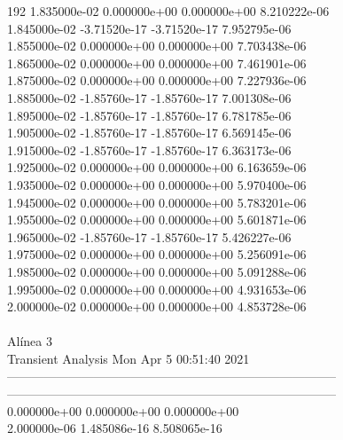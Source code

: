 192	1.835000e-02	0.000000e+00	0.000000e+00	8.210222e-06	\\ 	1.845000e-02	-3.71520e-17	-3.71520e-17	7.952795e-06	\\ 	1.855000e-02	0.000000e+00	0.000000e+00	7.703438e-06	\\ 	1.865000e-02	0.000000e+00	0.000000e+00	7.461901e-06	\\ 	1.875000e-02	0.000000e+00	0.000000e+00	7.227936e-06	\\ 	1.885000e-02	-1.85760e-17	-1.85760e-17	7.001308e-06	\\ 	1.895000e-02	-1.85760e-17	-1.85760e-17	6.781785e-06	\\ 	1.905000e-02	-1.85760e-17	-1.85760e-17	6.569145e-06	\\ 	1.915000e-02	-1.85760e-17	-1.85760e-17	6.363173e-06	\\ 	1.925000e-02	0.000000e+00	0.000000e+00	6.163659e-06	\\ 	1.935000e-02	0.000000e+00	0.000000e+00	5.970400e-06	\\ 	1.945000e-02	0.000000e+00	0.000000e+00	5.783201e-06	\\ 	1.955000e-02	0.000000e+00	0.000000e+00	5.601871e-06	\\ 	1.965000e-02	-1.85760e-17	-1.85760e-17	5.426227e-06	\\ 	1.975000e-02	0.000000e+00	0.000000e+00	5.256091e-06	\\ 	1.985000e-02	0.000000e+00	0.000000e+00	5.091288e-06	\\ 	1.995000e-02	0.000000e+00	0.000000e+00	4.931653e-06	\\ 	2.000000e-02	0.000000e+00	0.000000e+00	4.853728e-06	\\ \hline
\\ \hline
                                   Alínea 3 \\ \hline
                                   Transient Analysis  Mon Apr  5 00:51:40  2021\\ \hline
--------------------------------------------------------------------------------\\ \hline
--------------------------------------------------------------------------------\\ 	0.000000e+00	0.000000e+00	0.000000e+00	\\ 	2.000000e-06	1.485086e-16	8.508065e-16	\\ \hline
